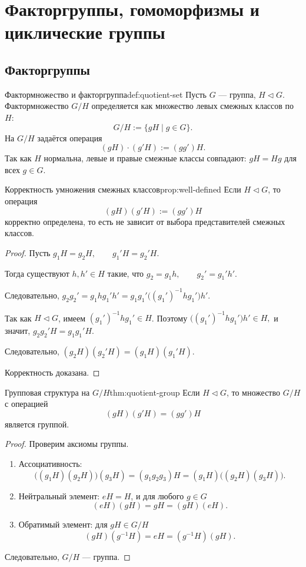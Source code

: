 
\section{Факторгруппы, гомоморфизмы и циклические группы}

\subsection{Факторгруппы}

\begin{Definition}{Фактормножество и факторгруппа}{def:quotient-set}
	Пусть $G$ --- группа, $H \triangleleft G$. Фактор\-множество $G/H$ определяется как множество левых смежных классов по $H$:
	\[
	G/H := \{gH \mid g \in G\}.
	\]
	На $G/H$ задаётся операция
	\[
	(gH)\cdot(g'H) := (gg')H.
	\]
	Так как $H$ нормальна, левые и правые смежные классы совпадают: $gH = Hg$ для всех $g \in G$.
\end{Definition}

\begin{Proposition}{Корректность умножения смежных классов}{prop:well-defined}
	Если $H \triangleleft G$, то операция
	\[
	(gH)(g'H) := (gg')H
	\]
	корректно определена, то есть не зависит от выбора представителей смежных классов.
\end{Proposition}

\begin{proof}
	Пусть $g_1H=g_2H, \qquad g_1'H=g_2'H$.
	
	Тогда существуют $h,h'\in H$ такие, что $g_2=g_1h, \qquad g_2'=g_1'h'$.

	Следовательно, $g_2g_2' = g_1 h g_1' h' = g_1 g_1'\bigl((g_1')^{-1} h g_1'\bigr)h'$.

	Так как $H \triangleleft G$, имеем $(g_1')^{-1} h g_1' \in H$. Поэтому $\bigl((g_1')^{-1} h g_1'\bigr)h' \in H,$ и значит, $g_2g_2'H = g_1g_1'H.$

	Следовательно, $(g_2H)(g_2'H)=(g_1H)(g_1'H).$

	Корректность доказана.
\end{proof}

\begin{Theorem}{Групповая структура на $G/H$}{thm:quotient-group}
	Если $H \triangleleft G$, то множество $G/H$ с операцией
	\[
	(gH)(g'H)=(gg')H
	\]
	является группой.
\end{Theorem}

\begin{proof}
	Проверим аксиомы группы.
	\begin{enumerate}
		\item Ассоциативность:
		\[
		\bigl((g_1H)(g_2H)\bigr)(g_3H) = (g_1g_2g_3)H = (g_1H)\bigl((g_2H)(g_3H)\bigr).
		\]
		\item Нейтральный элемент: $eH=H$, и для любого $g\in G$
		\[
		(eH)(gH)=gH=(gH)(eH).
		\]
		\item Обратимый элемент: для $gH\in G/H$
		\[
		(gH)(g^{-1}H)=eH=(g^{-1}H)(gH).
		\]
	\end{enumerate}
	Следовательно, $G/H$ --- группа.
\end{proof}

